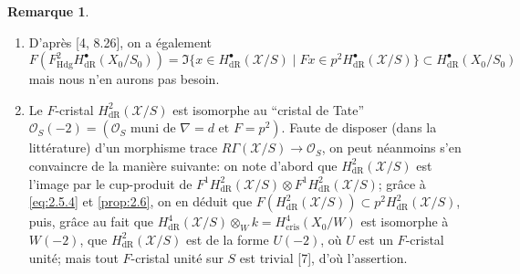 \documentclass[12pt,a4paper]{article}
\theoremstyle{plain}
\theoremstyle{definition}
\newtheorem{remark}[theorem]{Remarque}
\theoremstyle{remark}
\newcommand{\Hdg}{\mathrm{Hdg}}
\begin{document}
\begin{remark}\label{rem:2.7}
\begin{enumerate}[label=\alph*)]
\item D'après [4, 8.26], on a également
\begin{equation}\label{eq:2.7.1}
F(F^2_{\Hdg} H^{\bullet}_{\mathrm{dR}}(X_0/S_0)) = \Im\{x \in H^{\bullet}_{\mathrm{dR}}(\mathcal{X}/S) \mid Fx \in p^2 H^{\bullet}_{\mathrm{dR}}(\mathcal{X}/S)\} \subset H^{\bullet}_{\mathrm{dR}}(X_0/S_0)
\end{equation}
mais nous n'en aurons pas besoin.

\item Le $F$-cristal $H^2_{\mathrm{dR}}(\mathcal{X}/S)$ est isomorphe au ``cristal de Tate'' $\mathcal{O}_S(-2) = (\mathcal{O}_S \text{ muni de } \nabla = d \text{ et } F = p^2)$. Faute de disposer (dans la littérature) d'un morphisme trace $R\Gamma(\mathcal{X}/S) \to \mathcal{O}_S$, on peut néanmoins s'en convaincre de la manière suivante: on note d'abord que $H^2_{\mathrm{dR}}(\mathcal{X}/S)$ est l'image par le cup-produit de $F^1 H^2_{\mathrm{dR}}(\mathcal{X}/S) \otimes F^1 H^2_{\mathrm{dR}}(\mathcal{X}/S)$; grâce à \eqref{eq:2.5.4} et \ref{prop:2.6}, on en déduit que $F(H^2_{\mathrm{dR}}(\mathcal{X}/S)) \subset p^2 H^2_{\mathrm{dR}}(\mathcal{X}/S)$, puis, grâce au fait que $H^4_{\mathrm{dR}}(\mathcal{X}/S) \otimes_W k = H^4_{\mathrm{cris}}(X_0/W)$ est isomorphe à $W(-2)$, que $H^2_{\mathrm{dR}}(\mathcal{X}/S)$ est de la forme $U(-2)$, où $U$ est un $F$-cristal unité; mais tout $F$-cristal unité sur $S$ est trivial [7], d'où l'assertion.
\end{enumerate}
\end{remark}

\subsection{}
\end{document}
